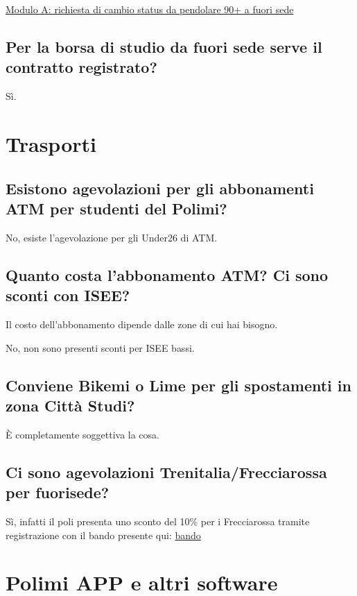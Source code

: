 \documentclass[legal]{polinetwork}
\begin{document}
\href{https://drive.google.com/uc?export=download\&id=11WPVTGq3oo7PXgafMkvt8GONBv2LFaTL}{Modulo A: richiesta di cambio status da pendolare 90+ a fuori sede}

\subsection{Per la borsa di studio da fuori sede serve il contratto registrato?}


Sì.

\section{Trasporti}


\subsection{Esistono agevolazioni per gli abbonamenti ATM per studenti del Polimi?}


No, esiste l'agevolazione per gli Under26 di ATM.

\subsection{Quanto costa l'abbonamento ATM? Ci sono sconti con ISEE?}


Il costo dell'abbonamento dipende dalle zone di cui hai bisogno.

No, non sono presenti sconti per ISEE bassi.

\subsection{Conviene Bikemi o Lime per gli spostamenti in zona Città Studi?}


È completamente soggettiva la cosa.

\subsection{Ci sono agevolazioni Trenitalia/Frecciarossa per fuorisede?}


Sì, infatti il poli presenta uno sconto del 10\% per i Frecciarossa tramite registrazione con il bando presente qui: \href{https://www.polimi.it/campus-e-servizi/convenzioni-e-agevolazioni/trenitalia}{bando}

\section{Polimi APP e altri software}
\end{document}

